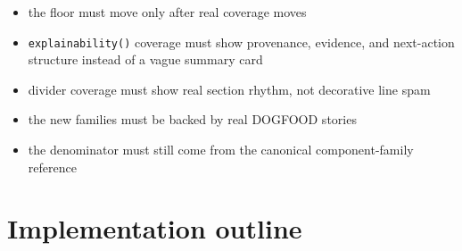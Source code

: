\begin{itemize}
\tightlist
\item
  the floor must move only after real coverage moves
\item
  \texttt{e\allowbreak{}x\allowbreak{}p\allowbreak{}l\allowbreak{}a\allowbreak{}i\allowbreak{}n\allowbreak{}a\allowbreak{}b\allowbreak{}i\allowbreak{}l\allowbreak{}i\allowbreak{}t\allowbreak{}y\allowbreak{}(\allowbreak{})} coverage must show provenance, evidence, and next-action structure instead of a vague summary card
\item
  divider coverage must show real section rhythm, not decorative line spam
\item
  the new families must be backed by real DOGFOOD stories
\item
  the denominator must still come from the canonical component-family reference
\end{itemize}

\section{Implementation outline}\label{record-074-implementation-outline}

